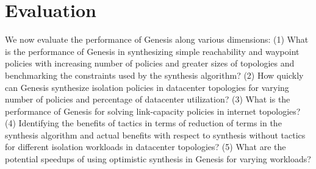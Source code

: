 \section{Evaluation}
We now evaluate the performance of Genesis along various dimensions:
 (1) What is the performance of Genesis in synthesizing simple reachability and waypoint policies
  with increasing number of policies and greater sizes of topologies and benchmarking the constraints used by the synthesis algorithm? 
  (2) How quickly can Genesis synthesize isolation policies in datacenter topologies for varying number of policies and percentage of
   datacenter utilization? 
   (3) What is the performance of Genesis for solving link-capacity policies in internet topologies? 
   (4) Identifying the benefits of tactics in terms of reduction of terms in the synthesis algorithm and actual benefits 
   with respect to synthesis without tactics for different isolation workloads in datacenter topologies? 
   (5) What are the potential speedups of using optimistic synthesis in Genesis for varying workloads? 

